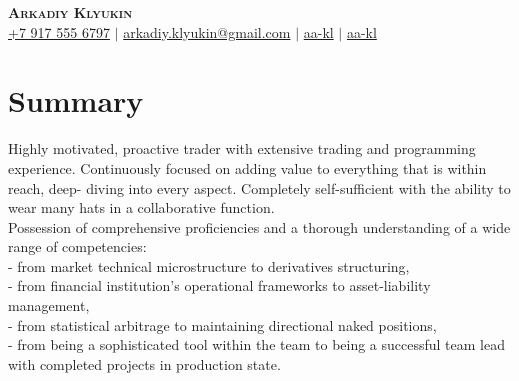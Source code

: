 \documentclass[a4paper,20pt]{article}
\begin{document}

\begin{center}
  \textbf{\Huge \scshape Arkadiy Klyukin} \\ \vspace{1pt}
  \small
  \faMobile \hspace{.5pt} \href{tel:+79175556797}{+7 917 555 6797}
  $|$
  \faAt \hspace{.5pt} \href{mailto:arkadiy.klyukin@gmail.com}{arkadiy.klyukin@gmail.com}
  $|$
  \faLinkedinSquare \hspace{.5pt} \href{https://www.linkedin.com/in/aa-kl}{aa-kl}
  $|$
  \faGithub \hspace{.5pt} \href{https://github.com/aa-kl}{aa-kl}
\end{center}

\vspace{-15pt}
\section{Summary}
Highly motivated, proactive trader with extensive trading and programming experience. Continuously focused on adding value to everything that is within reach, deep-
diving into every aspect. Completely self-sufficient with the ability to wear many hats in a collaborative function.\\
Possession of comprehensive proficiencies and a thorough understanding of a wide range of competencies:\\
- from market technical microstructure to derivatives structuring,\\
- from financial institution's operational frameworks to asset-liability management,\\
- from statistical arbitrage to maintaining directional naked positions,\\
- from being a sophisticated tool within the team to being a successful team lead with completed projects in production state.\\

\vspace{-3pt}
\end{document}
